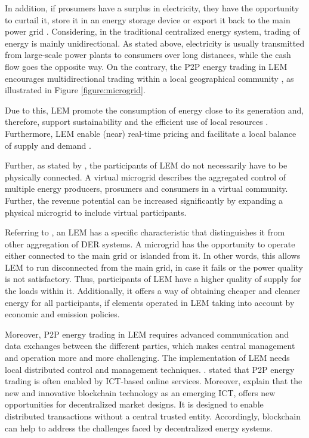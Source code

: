 In addition, if prosumers have a surplus in electricity, they have the opportunity 
to curtail it, store it in an energy storage device or export it back to the main power grid .
Considering, in the traditional centralized energy system, trading of energy is mainly unidirectional.
As stated above, electricity is usually transmitted from large-scale power plants to 
consumers over long distances, while the cash flow goes the opposite way. 
On the contrary, the P2P energy trading in LEM encourages multidirectional trading within 
a local geographical community , as illustrated in Figure \ref{figure:microgrid}.

Due to this, LEM promote the consumption of energy close to its generation and, therefore, 
support sustainability and the efficient use of local resources .
Furthermore, LEM enable (near) real-time pricing and facilitate a local balance
of supply and demand . 

Further, as stated by ,
the participants of LEM do not necessarily have to be physically connected. A virtual microgrid
describes the aggregated control of multiple energy producers, prosumers and consumers in a virtual 
community. Further, the revenue potential can be increased significantly by expanding a physical 
microgrid to include virtual participants. 

Referring to , an LEM has a specific characteristic
that distinguishes it from other aggregation of DER systems. A microgrid has the opportunity
to operate either connected to the main grid or islanded from it. In other words,
this allows LEM to run disconnected from the main grid, in case it fails or 
the power quality is not satisfactory. Thus, participants of LEM have a higher quality 
of supply for the loads within it. Additionally, it offers a way of obtaining cheaper 
and cleaner energy for all participants, if elements operated in LEM taking into 
account by economic and emission policies.

Moreover, P2P energy trading in LEM requires advanced communication and data 
exchanges between the different parties, which makes central management and 
operation more and more challenging. The implementation of LEM needs 
local distributed control and management techniques. . 
 stated that P2P energy trading is often
enabled by ICT-based online services. Moreover,  explain that 
the new and innovative blockchain technology as an emerging ICT, 
offers new opportunities for decentralized market designs.
It is designed to enable distributed transactions without 
a central trusted entity.
Accordingly, blockchain can help to address the challenges faced by 
decentralized energy systems. 

